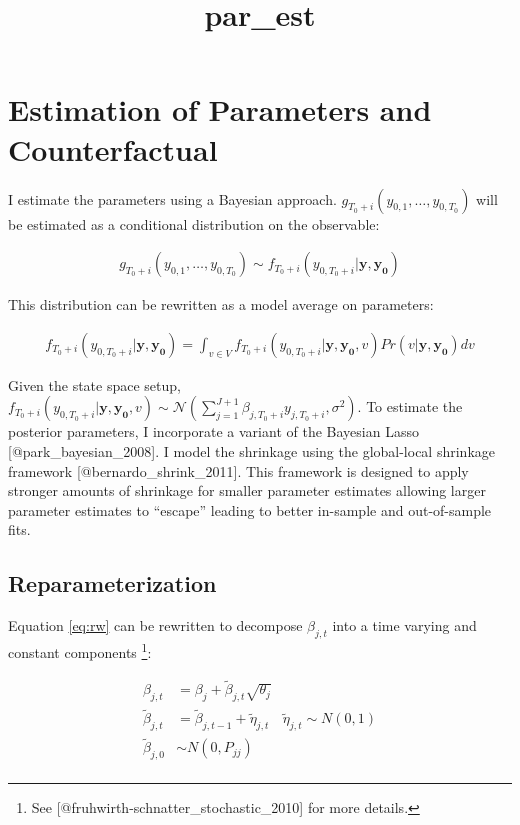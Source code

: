 \documentclass[
]{article}
\title{par\_est}
\author{}
\date{\vspace{-2.5em}}
\begin{document}
\maketitle

\hypertarget{estimation-of-parameters-and-counterfactual}{%
\section{Estimation of Parameters and
Counterfactual}\label{estimation-of-parameters-and-counterfactual}}

I estimate the parameters using a Bayesian approach.
\(g_{T_0+i}\left(y_{0,1},\dots,y_{0,T_0}\right)\) will be estimated as a
conditional distribution on the observable:

\begin{align}
g_{T_0+i}\left(y_{0,1},\dots,y_{0,T_0}\right) \sim f_{T_0+i}(y_{0,T_0+i}|\mathbf{y},\mathbf{y_0})
\end{align}

This distribution can be rewritten as a model average on parameters:

\begin{align}
f_{T_0+i}(y_{0,T_0+i}|\mathbf{y},\mathbf{y_0}) = \int_{v \in V} f_{T_0+i}(y_{0,T_0+i}|\mathbf{y},\mathbf{y_0},v)Pr(v|\mathbf{y},\mathbf{y_0})dv
\end{align}

Given the state space setup,
\(f_{T_0+i}(y_{0,T_0+i}|\mathbf{y},\mathbf{y_0},v) \sim \mathcal{N}\left(\sum_{j=1}^{J+1} \beta_{j,T_0+i}y_{j,T_0+i},\sigma^2\right)\).
To estimate the posterior parameters, I incorporate a variant of the
Bayesian Lasso {[}@park\_bayesian\_2008{]}. I model the shrinkage using
the global-local shrinkage framework {[}@bernardo\_shrink\_2011{]}. This
framework is designed to apply stronger amounts of shrinkage for smaller
parameter estimates allowing larger parameter estimates to ``escape''
leading to better in-sample and out-of-sample fits.

\hypertarget{reparameterization}{%
\subsection{Reparameterization}\label{reparameterization}}

Equation \eqref{eq:rw} can be rewritten to decompose \(\beta_{j,t}\)
into a time varying and constant components \footnote{See
  {[}@fruhwirth-schnatter\_stochastic\_2010{]} for more details.}:

\[
\begin{aligned}
\beta_{j,t}&=\beta_{j}+\tilde{\beta}_{j,t}\sqrt{\theta_j}\\
\tilde{\beta}_{j,t}&= \tilde{\beta}_{j,t-1}+\tilde{\eta}_{j,t} & \tilde{\eta}_{j,t} \sim N(0,1)\\
\tilde{\beta}_{j,0}& \sim N(0,P_{jj})\\
\end{aligned}
\]
\end{document}
